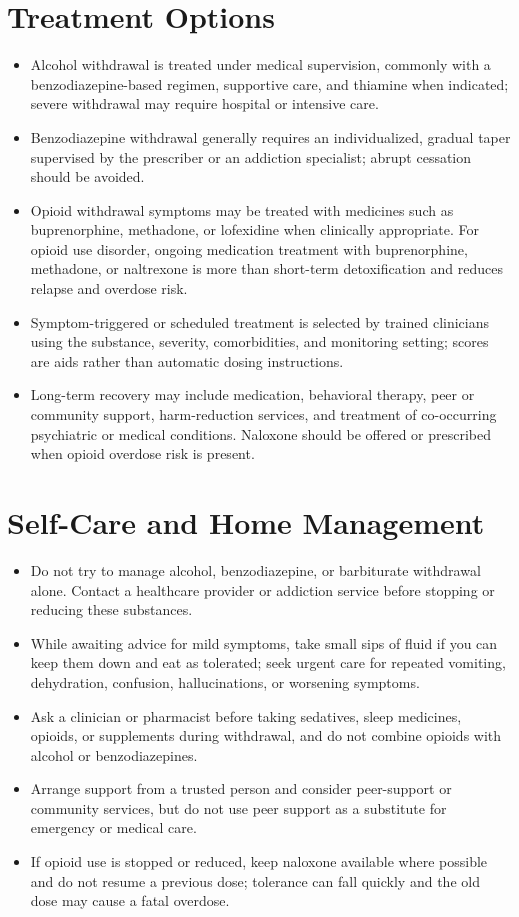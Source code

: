 \section*{Treatment Options}
\begin{itemize}
 \item Alcohol withdrawal is treated under medical supervision, commonly with a benzodiazepine-based regimen, supportive care, and thiamine when indicated; severe withdrawal may require hospital or intensive care.
 \item Benzodiazepine withdrawal generally requires an individualized, gradual taper supervised by the prescriber or an addiction specialist; abrupt cessation should be avoided.
 \item Opioid withdrawal symptoms may be treated with medicines such as buprenorphine, methadone, or lofexidine when clinically appropriate. For opioid use disorder, ongoing medication treatment with buprenorphine, methadone, or naltrexone is more than short-term detoxification and reduces relapse and overdose risk.
 \item Symptom-triggered or scheduled treatment is selected by trained clinicians using the substance, severity, comorbidities, and monitoring setting; scores are aids rather than automatic dosing instructions.
 \item Long-term recovery may include medication, behavioral therapy, peer or community support, harm-reduction services, and treatment of co-occurring psychiatric or medical conditions. Naloxone should be offered or prescribed when opioid overdose risk is present.
\end{itemize}

\section*{Self-Care and Home Management}
\begin{itemize}
 \item Do not try to manage alcohol, benzodiazepine, or barbiturate withdrawal alone. Contact a healthcare provider or addiction service before stopping or reducing these substances.
 \item While awaiting advice for mild symptoms, take small sips of fluid if you can keep them down and eat as tolerated; seek urgent care for repeated vomiting, dehydration, confusion, hallucinations, or worsening symptoms.
 \item Ask a clinician or pharmacist before taking sedatives, sleep medicines, opioids, or supplements during withdrawal, and do not combine opioids with alcohol or benzodiazepines.
 \item Arrange support from a trusted person and consider peer-support or community services, but do not use peer support as a substitute for emergency or medical care.
 \item If opioid use is stopped or reduced, keep naloxone available where possible and do not resume a previous dose; tolerance can fall quickly and the old dose may cause a fatal overdose.
\end{itemize}

